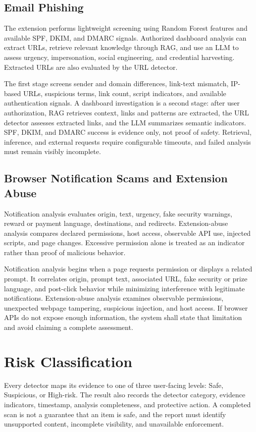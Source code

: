 \subsection{Email Phishing}
The extension performs lightweight screening using Random Forest features and
available SPF, DKIM, and DMARC signals. Authorized dashboard analysis can extract
URLs, retrieve relevant knowledge through RAG, and use an LLM to assess urgency,
impersonation, social engineering, and credential harvesting. Extracted URLs are
also evaluated by the URL detector.

The first stage screens sender and domain differences, link-text mismatch,
IP-based URLs, suspicious terms, link count, script indicators, and available
authentication signals. A dashboard investigation is a second stage: after user
authorization, RAG retrieves context, links and patterns are extracted, the URL
detector assesses extracted links, and the LLM summarizes semantic indicators.
SPF, DKIM, and DMARC success is evidence only, not proof of safety. Retrieval,
inference, and external requests require configurable timeouts, and failed analysis
must remain visibly incomplete.

\subsection{Browser Notification Scams and Extension Abuse}
Notification analysis evaluates origin, text, urgency, fake security warnings,
reward or payment language, destinations, and redirects. Extension-abuse analysis
compares declared permissions, host access, observable API use, injected scripts,
and page changes. Excessive permission alone is treated as an indicator rather
than proof of malicious behavior.

Notification analysis begins when a page requests permission or displays a related
prompt. It correlates origin, prompt text, associated URL, fake security or prize
language, and post-click behavior while minimizing interference with legitimate
notifications. Extension-abuse analysis examines observable permissions,
unexpected webpage tampering, suspicious injection, and host access. If browser
APIs do not expose enough information, the system shall state that limitation and
avoid claiming a complete assessment.

\section{Risk Classification}
Every detector maps its evidence to one of three user-facing levels: Safe,
Suspicious, or High-risk. The result also records the detector category, evidence
indicators, timestamp, analysis completeness, and protective action. A completed
scan is not a guarantee that an item is safe, and the report must identify
unsupported content, incomplete visibility, and unavailable enforcement.

